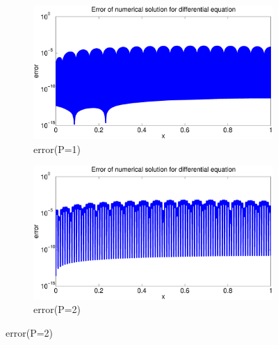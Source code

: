 \documentclass[paper=a4, fontsize=11pt]{article} %
\begin{document}
\begin{figure}
        \centering
        \begin{subfigure}[b]{0.8\textwidth}
                \includegraphics[width=\textwidth]{error_P1.eps}
                \caption{error(P=1)}
                \label{fig:e1}
        \end{subfigure}%

        \begin{subfigure}[b]{0.8\textwidth}
                \includegraphics[width=\textwidth]{error_P2.eps}
                \caption{error(P=2)}
                \label{fig:e2}
        \end{subfigure}
        

\end{figure}
\end{document}
